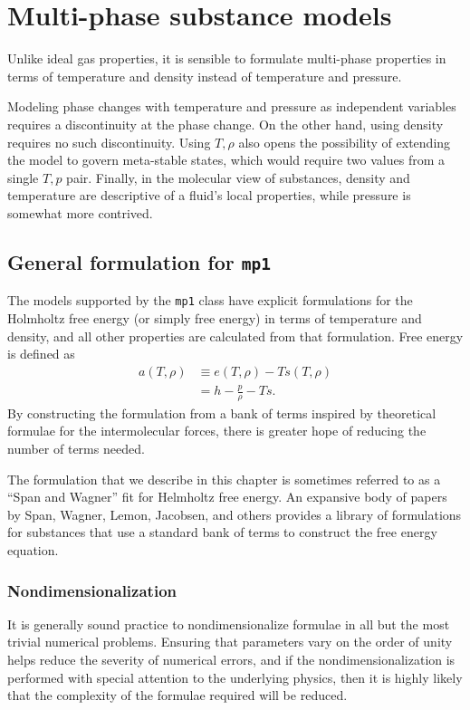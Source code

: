\chapter{Multi-phase substance models}\label{ch:multiphase}

Unlike ideal gas properties, it is sensible to formulate multi-phase properties in terms of temperature and density instead of temperature and pressure.  

Modeling phase changes with temperature and pressure as independent variables requires a discontinuity at the phase change.  On the other hand, using density requires no such discontinuity.  Using $T,\rho$ also opens the possibility of extending the model to govern meta-stable states, which would require two values from a single $T,p$ pair.  Finally, in the molecular view of substances, density and temperature are descriptive of a fluid's local properties, while pressure is somewhat more contrived.

\section{General formulation for \texttt{mp1}}\label{sec:mp1}

The models supported by the \texttt{mp1} class have explicit formulations for the Holmholtz free energy (or simply free energy) in terms of temperature and density, and all other properties are calculated from that formulation.  Free energy is defined as
\begin{align}
a(T,\rho) &\equiv e(T,\rho) - T s(T,\rho)\\
 &= h - \frac{p}{\rho} - T s.
\end{align}
By constructing the formulation from a bank of terms inspired by theoretical formulae for the intermolecular forces, there is greater hope of reducing the number of terms needed. 

The formulation that we describe in this chapter is sometimes referred to as a ``Span and Wagner'' fit for Helmholtz free energy.  An expansive body of papers by Span, Wagner, Lemon, Jacobsen, and others provides a library of formulations for substances that use a standard bank of terms to construct the free energy equation.

\subsection{Nondimensionalization}

It is generally sound practice to nondimensionalize formulae in all but the most trivial numerical problems.  Ensuring that parameters vary on the order of unity helps reduce the severity of numerical errors, and if the nondimensionalization is performed with special attention to the underlying physics, then it is highly likely that the complexity of the formulae required will be reduced.

